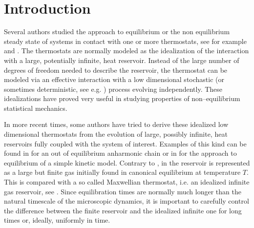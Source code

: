 \documentclass[11pt]{article}
\numberwithin{equation}{section}
\numberwithin{theorem}{section}
\begin{document}
\section{Introduction}
\label{sec:intro}

Several authors studied the approach to equilibrium or the non equilibrium steady state of systems in contact with one
or more thermostats, see for example \cite{RLL67} and \cite{BLV}. The thermostats are normally modeled as the
idealization of the interaction with a large, potentially infinite, heat reservoir. Instead of the large number of
degrees of freedom needed to describe the reservoir, the thermostat can be modeled via an effective interaction with a
low dimensional stochastic (or sometimes deterministic, see e.g. \cite{EH85,CELS,BDLR}) process evolving independently.
These idealizations have proved very useful in studying properties of non--equilibrium statistical mechanics.

In more recent times, some authors have tried to derive these idealized low dimensional thermostats from the evolution
of large, possibly infinite, heat reservoirs fully coupled with the system of interest. Examples of this kind can be
found in \cite{EPR-B99} for an out of equilibrium anharmonic chain or in \cite{BLTV} for the approach to equilibrium of
a simple kinetic model. Contrary to \cite{EPR-B99}, in \cite{BLTV} the reservoir is represented as a large but finite
gas initially found in canonical equilibrium at temperature $T$. This is compared with a so called Maxwellian
thermostat, i.e. an idealized infinite gas reservoir, see \cite{BLV}. Since equilibration times are normally much longer
than the natural timescale of the microscopic dynamics, it is important to carefully control the difference between the
finite reservoir and the idealized infinite one for long times or, ideally, uniformly in time.
\end{document}
